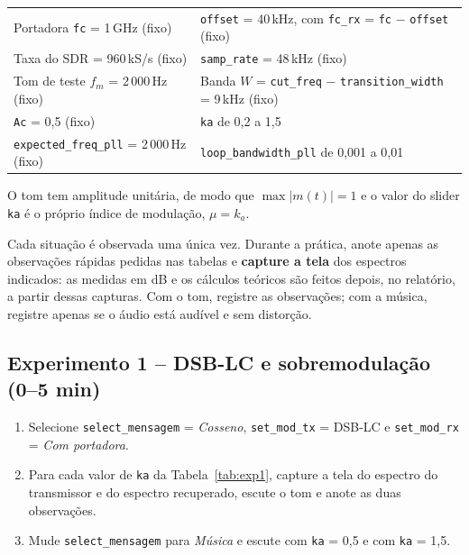 \documentclass[11pt,a4paper]{article}
\begin{document}
\begin{center}
      \small
      \begin{tabular}{l l}
            \toprule
            Portadora \texttt{fc} = 1\,GHz (fixo)            & \texttt{offset} = 40\,kHz, com \texttt{fc\_rx} = \texttt{fc} $-$ \texttt{offset} (fixo) \\
            Taxa do SDR = 960\,kS/s  (fixo)                  & \texttt{samp\_rate} = 48\,kHz  (fixo)                                                   \\
            Tom de teste $f_m$ = 2\,000\,Hz (fixo)           & Banda $W$ = \texttt{cut\_freq} $-$ \texttt{transition\_width} = 9\,kHz (fixo)           \\
            \texttt{Ac} = 0,5 (fixo)                         & \texttt{ka} de 0,2 a 1,5                                                                \\
            \texttt{expected\_freq\_pll} = 2\,000\,Hz (fixo) & \texttt{loop\_bandwidth\_pll} de 0,001 a 0,01                                           \\
            \bottomrule
      \end{tabular}
\end{center}

O tom tem amplitude unitária, de modo que $\max|m(t)| = 1$ e o valor do slider
\texttt{ka} é o próprio índice de modulação, $\mu = k_a$.

\begin{instrucao}
      Cada situação é observada uma única vez. Durante a prática, anote apenas as
      observações rápidas pedidas nas tabelas e \textbf{capture a tela} dos
      espectros indicados: as medidas em dB e os cálculos teóricos são feitos
      depois, no relatório, a partir dessas capturas. Com o tom, registre as
      observações; com a música, registre apenas se o áudio está audível e sem
      distorção.
\end{instrucao}

\subsection*{Experimento 1 -- DSB-LC e sobremodulação (0--5 min)}

\begin{instrucao}[Variação de $k_a$]
      \begin{enumerate}[label=\arabic*.]
            \item Selecione \texttt{select\_mensagem} = \emph{Cosseno},
                  \texttt{set\_mod\_tx} = DSB-LC e \texttt{set\_mod\_rx} =
                  \emph{Com portadora}.
            \item Para cada valor de \texttt{ka} da Tabela~\ref{tab:exp1}, capture a
                  tela do espectro do transmissor e do espectro recuperado, escute o
                  tom e anote as duas observações.
            \item Mude \texttt{select\_mensagem} para \emph{Música} e escute com
                  \texttt{ka} = 0,5 e com \texttt{ka} = 1,5.
      \end{enumerate}
\end{instrucao}
\end{document}
